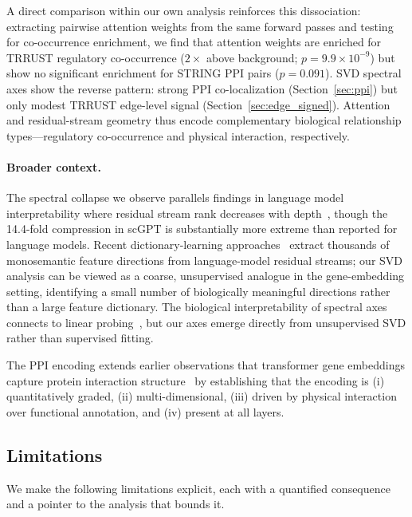 \documentclass[12pt]{article}
\begin{document}
A direct comparison within our own analysis reinforces this dissociation: extracting pairwise attention weights from the same forward passes and testing for co-occurrence enrichment, we find that attention weights are enriched for TRRUST regulatory co-occurrence ($2\times$ above background; $p = 9.9 \times 10^{-9}$) but show no significant enrichment for STRING PPI pairs ($p = 0.091$).
SVD spectral axes show the reverse pattern: strong PPI co-localization (Section~\ref{sec:ppi}) but only modest TRRUST edge-level signal (Section~\ref{sec:edge_signed}).
Attention and residual-stream geometry thus encode complementary biological relationship types---regulatory co-occurrence and physical interaction, respectively.

\paragraph{Broader context.}
The spectral collapse we observe parallels findings in language model interpretability where residual stream rank decreases with depth~\cite{sharma2024truth}, though the 14.4-fold compression in scGPT is substantially more extreme than reported for language models.
Recent dictionary-learning approaches~\cite{bricken2023monosemanticity,templeton2024scaling} extract thousands of monosemantic feature directions from language-model residual streams; our SVD analysis can be viewed as a coarse, unsupervised analogue in the gene-embedding setting, identifying a small number of biologically meaningful directions rather than a large feature dictionary.
The biological interpretability of spectral axes connects to linear probing~\cite{alain2017understanding}, but our axes emerge directly from unsupervised SVD rather than supervised fitting.

The PPI encoding extends earlier observations that transformer gene embeddings capture protein interaction structure~\cite{cui2024scgpt} by establishing that the encoding is (i) quantitatively graded, (ii) multi-dimensional, (iii) driven by physical interaction over functional annotation, and (iv) present at all layers.

\subsection{Limitations}

We make the following limitations explicit, each with a quantified consequence and a pointer to the analysis that bounds it.
\end{document}
